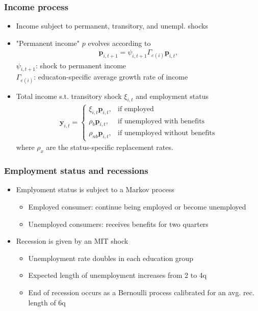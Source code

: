\documentclass[pdflatex,aspectratio=169]{beamer}
\begin{document}
\begin{frame}
\frametitle{ Income process}

	\begin{itemize}
		\itemsep = .5\bigskipamount 
		\item Income subject to permanent, transitory, and unempl. shocks
		\item "Permanent income" $p$ evolves according to
		\begin{align}
		\mathbf{p}_{i,t+1} = \psi_{i,t+1}\Gamma_{e(i)}\mathbf{p}_{i,t},
		\end{align}
	 	$\psi_{i,t+1}$: shock to permanent income \\[.7ex]
	 	$\Gamma_{e(i)}$: educaton-specific average growth rate of income 
		\item Total income s.t. transitory shock $\xi_{i,t}$ and  employment status
		\begin{align}
		\mathbf{y}_{i,t} =   \begin{cases}
		\xi_{i,t}\mathbf{p}_{i,t}, & \text{if employed} \\
		\rho_b \mathbf{p}_{i,t}, & \text{if unemployed with benefits} \\
		\rho_{nb} \mathbf{p}_{i,t}, & \text{if unemployed without benefits} 
		\end{cases}
		\end{align}
		where $\rho_x$ are the status-specific replacement rates.
	\end{itemize}

\end{frame}


\begin{frame}
\frametitle{ Employment status and recessions}
\begin{itemize}
	\itemsep = \bigskipamount 
	\item Emplyoment status is subject to a Markov process
	\begin{itemize}
		\itemsep = .5\bigskipamount
		\item Employed consumer: continue being employed or become unemployed 
		\item Unemployed consumers: receives benefits for two quarters
	\end{itemize}

	\item Recession is given by an MIT shock
	\begin{itemize}
		\itemsep = .5\bigskipamount
		\item Unemployment rate doubles in each education group
		\item Expected length of unemployment increases from 2 to 4q
		\item End of recession occurs as a Bernoulli process calibrated for an avg. rec. length of 6q
	\end{itemize}
\end{itemize}
\end{frame}
\end{document}
